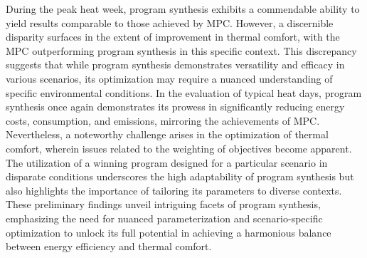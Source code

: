 During the peak heat week, program synthesis exhibits a commendable ability to yield results comparable to those achieved by MPC. However, a discernible disparity surfaces in the extent of improvement in thermal comfort, with the MPC outperforming program synthesis in this specific context. This discrepancy suggests that while program synthesis demonstrates versatility and efficacy in various scenarios, its optimization may require a nuanced understanding of specific environmental conditions. In the evaluation of typical heat days, program synthesis once again demonstrates its prowess in significantly reducing energy costs, consumption, and emissions, mirroring the achievements of MPC. Nevertheless, a noteworthy challenge arises in the optimization of thermal comfort, wherein issues related to the weighting of objectives become apparent. The utilization of a winning program designed for a particular scenario in disparate conditions underscores the high adaptability of program synthesis but also highlights the importance of tailoring its parameters to diverse contexts. These preliminary findings unveil intriguing facets of program synthesis, emphasizing the need for nuanced parameterization and scenario-specific optimization to unlock its full potential in achieving a harmonious balance between energy efficiency and thermal comfort.